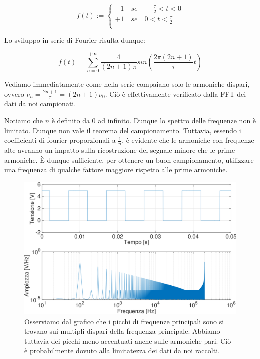 \begin{displaymath}
f(t):=
\begin{cases}
-1 \quad se \quad -\frac{\tau}{2}<t<0 \\
+1 \quad se \quad 0<t<\frac{\tau}{2} \\ 
\end{cases}
\end{displaymath}

Lo sviluppo in serie di Fourier risulta dunque: 

\begin{equation}
f(t)=\sum_{n=0}^{+\infty}\frac{4}{(2n+1)\pi}sin (\frac{2\pi(2n+1)}{\tau}t)
\end{equation}

Vediamo immediatamente come nella serie compaiano solo le armoniche dispari, ovvero $\nu_n=\frac{2n+1}{\tau}=(2n+1)\nu_0$. Ciò è effettivamente verificato dalla FFT dei dati da noi campionati.

Notiamo che $n$ è definito da 0 ad infinito. Dunque lo spettro delle frequenze non è limitato. Dunque non vale il teorema del campionamento. Tuttavia, essendo i coefficienti di fourier proporzionali a $\frac{1}{n}$, è evidente che le armoniche con frequenze alte avranno un impatto sulla ricostruzione del segnale minore che le prime armoniche. È dunque sufficiente, per ottenere un buon campionamento, utilizzare una frequenza di qualche fattore maggiore rispetto alle prime armoniche. 





\begin{figure}[H]
\centering
	\includegraphics[width=.65\textwidth]{../E13/latex/quadra100hz@10000,200000_crop.pdf}
	\caption{Osserviamo dal grafico che i picchi di frequenze principali sono si trovano sui multipli dispari della frequenza principale. Abbiamo tuttavia dei picchi meno accentuati anche sulle armoniche pari. Ciò è probabilmente dovuto alla limitatezza dei dati da noi raccolti.}
	\label{quadra}
\end{figure}


